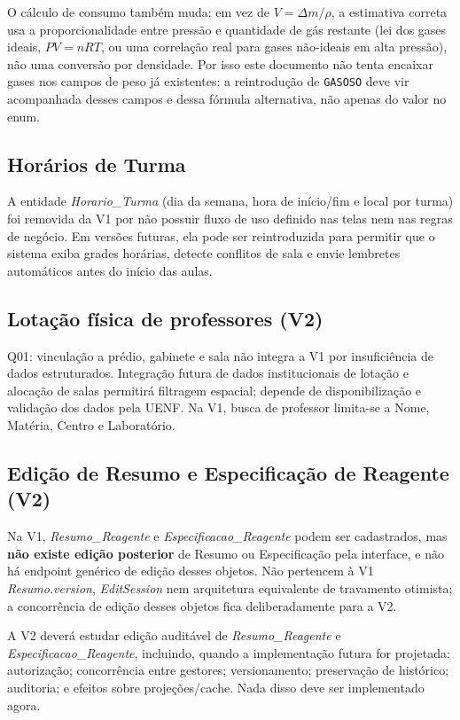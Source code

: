 O cálculo de consumo também muda: em vez de $V = \Delta m / \rho$, a estimativa correta usa a proporcionalidade entre pressão e quantidade de gás restante (lei dos gases ideais, $PV = nRT$, ou uma correlação real para gases não-ideais em alta pressão), não uma conversão por densidade. Por isso este documento não tenta encaixar gases nos campos de peso já existentes: a reintrodução de \texttt{GASOSO} deve vir acompanhada desses campos e dessa fórmula alternativa, não apenas do valor no enum.

\subsection{Horários de Turma}
A entidade \textit{Horario\_Turma} (dia da semana, hora de início/fim e local por turma) foi removida da V1 por não possuir fluxo de uso definido nas telas nem nas regras de negócio. Em versões futuras, ela pode ser reintroduzida para permitir que o sistema exiba grades horárias, detecte conflitos de sala e envie lembretes automáticos antes do início das aulas.

\subsection{Lotação física de professores (V2)}
Q01: vinculação a prédio, gabinete e sala não integra a V1 por insuficiência de dados estruturados. Integração futura de dados institucionais de lotação e alocação de salas permitirá filtragem espacial; depende de disponibilização e validação dos dados pela UENF. Na V1, busca de professor limita-se a Nome, Matéria, Centro e Laboratório.

\subsection{Edição de Resumo e Especificação de Reagente (V2)}
Na V1, \textit{Resumo\_Reagente} e \textit{Especificacao\_Reagente} podem ser cadastrados, mas \textbf{não existe edição posterior} de Resumo ou Especificação pela interface, e não há endpoint genérico de edição desses objetos. Não pertencem à V1 \textit{Resumo.version}, \textit{EditSession} nem arquitetura equivalente de travamento otimista; a concorrência de edição desses objetos fica deliberadamente para a V2.

A V2 deverá estudar edição auditável de \textit{Resumo\_Reagente} e \textit{Especificacao\_Reagente}, incluindo, quando a implementação futura for projetada: autorização; concorrência entre gestores; versionamento; preservação de histórico; auditoria; e efeitos sobre projeções/cache. Nada disso deve ser implementado agora.

